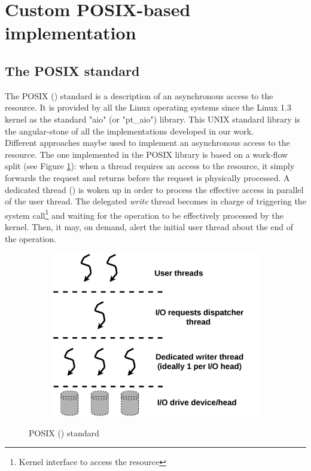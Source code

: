 \section{Custom POSIX-based \notationaio\space implementation}\label{section:customAioImplementation}
	\subsection{The POSIX \notationaio\space standard} \label{subsection:AIO_posix_standard}
		The POSIX \notationaio\space (\notationaioShort) standard\cite{bhattacharya2003asynchronous} is a description of an asynchronous access to the \notationIO\space resource.   It is provided by all the Linux operating systems since the Linux 1.3 kernel as the standard "aio" (or "pt\_aio") library.   This UNIX standard library is the angular-stone of all the implementations developed in our work.\\

		Different approaches maybe used to implement an asynchronous access to the \notationIO\space resource.   The one implemented in the POSIX \notationaioShort\space library is based on a work-flow split (see Figure \ref{fig:posixAIO_basis}): when a thread requires an access to the \notationIO\space resource, it simply forwards the request and returns before the request is physically processed.   A dedicated thread (\notationaioWriteThread) is woken up in order to process the effective \notationIO\space access in parallel of the user thread.   The delegated \emph{write} thread becomes in charge of triggering the system call\footnote{Kernel interface to access the \notationIO\space resource} and waiting for the operation to be effectively processed by the kernel.    Then, it may, on demand, alert the initial user thread about the end of the operation.\\
			\begin{figure}[!h]
				\centering
				\begin{subfigure}[b]{0.7\textwidth}
					\centering
					\includegraphics[width=\textwidth]{charts/internship_juelich_posixAIO_basis.png}
				\end{subfigure}
				\caption{POSIX \notationaio\space (\notationaioShort) standard}
				\label{fig:posixAIO_basis}
			\end{figure}

